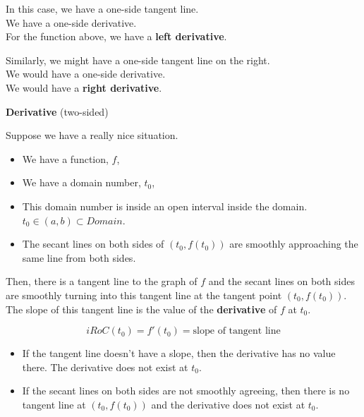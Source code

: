 \documentclass{ximera}
\begin{document}
In this case, we have a one-side tangent line.  \\

We have a one-side derivative. \\


For the function above, we have a \textbf{left derivative}.












Similarly, we might have a one-side tangent line on the right.  \\

We would have a one-side derivative. \\


We would have a \textbf{right derivative}.









\begin{definition} \textbf{\textcolor{green!50!black}{Derivative}}  (two-sided)


Suppose we have a really nice situation.


\begin{itemize}
\item We have a function, $f$, 
\item We have a domain number, $t_0$, 
\item This domain number is inside an open interval inside the domain.  $t_0 \in (a, b) \subset Domain$. 
\item The secant lines on both sides of $(t_0, f(t_0))$ are smoothly approaching the same line from both sides.
\end{itemize}

Then, there is a tangent line to the graph of $f$ and the secant lines on both sides are smoothly turning into this tangent line at the tangent point $(t_0, f(t_0))$. \\

The slope of this tangent line is the value of the \textbf{derivative} of $f$ at $t_0$.

\[
iRoC(t_0) =f'(t_0) = \text{slope of tangent line}
\]


\begin{itemize}
  \item If the tangent line doesn't have a slope, then the derivative has no value there. The derivative does not exist at $t_0$.

  \item If the secant lines on both sides are not smoothly agreeing, then there is no tangent line at $(t_0, f(t_0))$ and the derivative does not exist at $t_0$.   
\end{itemize}

\end{definition}
\end{document}
